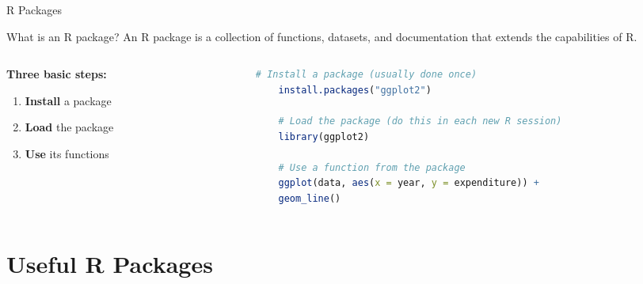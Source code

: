 \documentclass[aspectratio=169,11pt]{beamer}
\begin{document}
	\begin{frame}[fragile]{R Packages}
		
		\begin{block}{What is an R package?}
			An R package is a collection of functions, datasets, and documentation
			that extends the capabilities of R.
		\end{block}
		
		\vspace{0.3cm}
		\begin{columns}
		\begin{column}{.3\textwidth}
			\textbf{Three basic steps:}
		
		\begin{enumerate}
			\item \textbf{Install} a package
			\item \textbf{Load} the package
			\item \textbf{Use} its functions
		\end{enumerate}
		\end{column}
	
		\begin{column}{.7\textwidth}
	
		\begin{minipage}{0.7\textwidth}
		\begin{lstlisting}[language=R]
	# Install a package (usually done once)
	install.packages("ggplot2")
	
	# Load the package (do this in each new R session)
	library(ggplot2)
	
	# Use a function from the package
	ggplot(data, aes(x = year, y = expenditure)) +
	geom_line()
		\end{lstlisting}
	\end{minipage}
	
		\end{column}	
	\end{columns}
	\end{frame}
	
	
	\section{Useful R Packages}
	
\end{document}
